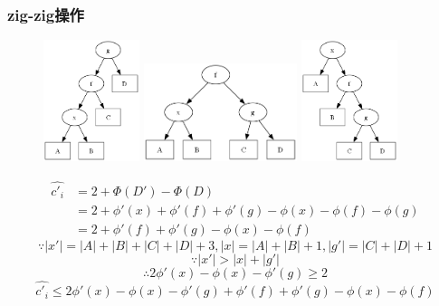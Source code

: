 \documentclass[utf8]{ctexbeamer}
\begin{document}
    \begin{frame}
        \frametitle{zig-zig操作}
        \begin{figure}
            \includegraphics[width=0.25\textwidth]{images/splay_zig-zig0.png}
            \includegraphics[width=0.4\textwidth]{images/splay_zig-zig1.png}
            \includegraphics[width=0.25\textwidth]{images/splay_zig-zig2.png}
        \end{figure}
        \begin{align}
            \hat{c'_i}&=2+\Phi(D')-\Phi(D)\nonumber\\
                      &=2+\phi'(x)+\phi'(f)+\phi'(g)-\phi(x)-\phi(f)-\phi(g)\nonumber\\
                      &=2+\phi'(f)+\phi'(g)-\phi(x)-\phi(f)\nonumber
        \end{align}
        \[\because\left\lvert x'\right\rvert=\left\lvert A\right\rvert+\left\lvert B\right\rvert+\left\lvert C\right\rvert+\left\lvert D\right\rvert+3,\left\lvert x\right\rvert=\left\lvert A\right\rvert+\left\lvert B\right\rvert+1,\left\lvert g'\right\rvert=\left\lvert C\right\rvert+\left\lvert D\right\rvert+1\]
        \[\because\left\lvert x'\right\rvert>\left\lvert x\right\rvert+\left\lvert g'\right\rvert\]
        \[\therefore2\phi'(x)-\phi(x)-\phi'(g)\ge2\]
        \[\hat{c'_i}\le2\phi'(x)-\phi(x)-\phi'(g)+\phi'(f)+\phi'(g)-\phi(x)-\phi(f)\]
    \end{frame}
\end{document}
